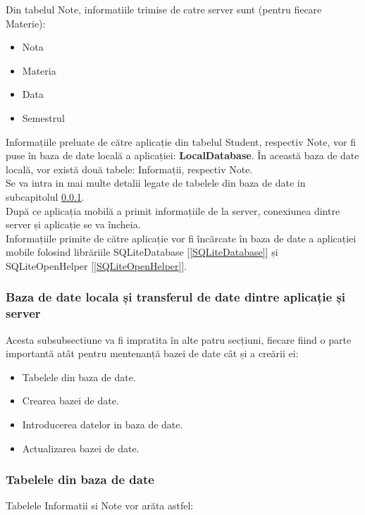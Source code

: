 \documentclass{article}
\begin{document}
	Din tabelul Note, informatiile trimise de catre server sunt (pentru fiecare Materie):
	\begin{itemize}
		\item Nota
		\item Materia
		\item Data
		\item Semestrul
	\end{itemize}

	Informațiile preluate de către aplicație din tabelul Student, respectiv Note, vor fi puse în baza de date locală a aplicației: \textbf{LocalDatabase}. În această baza de date locală, vor există două tabele: Informații, respectiv Note. \\

	Se va intra in mai multe detalii legate de tabelele din baza de date in subcapitolul \ref{Baza de date}. \\

	După ce aplicația mobilă a primit informațiile de la server, conexiunea dintre server și aplicație se va încheia. \\

	Informațiile primite de către aplicație vor fi încărcate în baza de date a aplicației mobile folosind librăriile SQLiteDatabase [\ref{SQLiteDatabase}] și SQLiteOpenHelper [\ref{SQLiteOpenHelper}]. 
			
		\subsubsection{Baza de date locala  și transferul de date dintre aplicație și server}\label{Baza de date}

		
  		Acesta subsubsectiune va fi impratita în alte patru secțiuni, fiecare fiind o parte importantă atât pentru mentenanță bazei de date cât și a creării ei:

	\begin{itemize}
		\item Tabelele din baza de date.
		\item Crearea bazei de date.
		\item Introducerea datelor in baza de date.
		\item Actualizarea bazei de date.
	\end{itemize}

		\subsubsection*{Tabelele din baza de date}
	Tabelele Informatii si Note vor arăta astfel:
\end{document}
